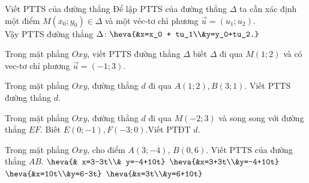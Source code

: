 \begin{dang}{Viết PTTS của đường thẳng}
	Để lập PTTS của đường thẳng $\Delta$ ta cần xác định một điểm $M \left(x_0; y_0 \right) \in \Delta$ và một véc-tơ chỉ phương $ \overrightarrow{u} = \left(u_1; u_2 \right)$.\\
	Vậy PTTS đường thẳng $\Delta \colon \heva{&x=x_0 + tu_1\\&y=y_0+tu_2.}$
\end{dang}
\viduminhhoa
\begin{vd}%
	Trong mặt phẳng $Oxy$, viết PTTS đường thẳng $\Delta$ biết $\Delta$ đi qua $M(1;2)$ và có vec-tơ chỉ phương $ \overrightarrow{u} = (-1;3)$.
\end{vd}
\begin{vd}%
	Trong mặt phẳng $Oxy$, đường thẳng $d$ đi qua $A \left(1; 2 \right), B \left(3;1 \right)$. Viết PTTS đường thẳng $d$.
\end{vd}
\begin{vd}%
	Trong mặt phẳng $Oxy$, đường thẳng $d$ đi qua $M(-2;3)$ và song song với đường thẳng $EF$. Biết $E(0;-1), F(-3;0)$.Viết PTĐT $d$.
\end{vd}
\baitaptl   

\begin{ex}%
	Trong mặt phẳng $Oxy$, cho điểm $A (3;-4)$, $B(0,6)$. Viết PTTS của đường thẳng $AB$.
	\choice
	{\True $\heva{& x=3-3t\\& y=-4+10t}$}
	{$\heva{&x=3+3t\\&y=-4+10t}$}
	{$\heva{&x=10t\\&y=6-3t}$}
	{$\heva{&x=3t\\&y=6+10t}$}
\end{ex}


